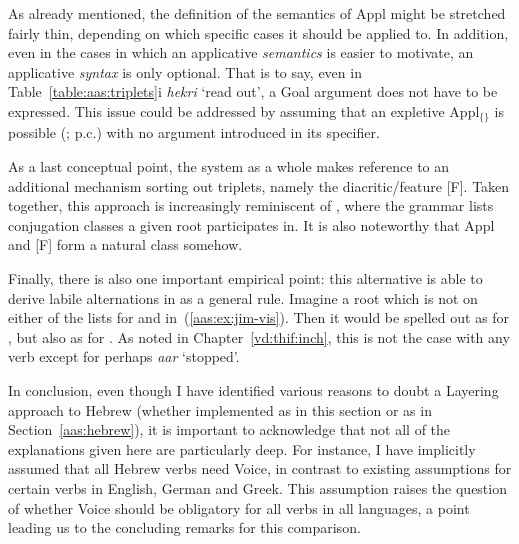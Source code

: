 \begin{exe}
\begin{xlist}
\begin{exe}
\begin{exe}
\begin{xlist}
\begin{exe}
\begin{exe}
\begin{exe}
\begin{exe}
\begin{exe}
\begin{xlist}
\begin{exe}
\begin{exe}
\begin{xlist}
\begin{exe}
\begin{xlist}
\begin{exe}
\begin{xlist}
\begin{exe}
\begin{xlist}
As already mentioned, the definition of the semantics of Appl might be stretched fairly thin, depending on which specific cases it should be applied to. In addition, even in the cases in which an applicative \emph{semantics} is easier to motivate, an applicative \emph{syntax} is only optional. That is to say, even in Table~\ref{table:aas:triplets}i \emph{hekri} `read out', a Goal argument does not have to be expressed. This issue could be addressed by assuming that an expletive Appl$_{\text{\{\}}}$ is possible (\citealt{wood15springer}; p.c.) with no argument introduced in its specifier.

As a last conceptual point, the system as a whole makes reference to an additional mechanism sorting out triplets, namely the diacritic/feature [F]. Taken together, this approach is increasingly reminiscent of \cite{arad05}, where the grammar lists conjugation classes a given root participates in. It is also noteworthy that Appl and [F] form a natural class somehow. 

Finally, there is also one important empirical point: this alternative is able to derive labile alternations in {\tkal} as a general rule. Imagine a root  which is not on either of the lists for {\vds} and {\vzs} in~(\ref{aas:ex:jim-vis}). Then it would be spelled out as {\tkal} for {\vds}, but also as {\tkal} for {\vzs}. As noted in Chapter~\ref{vd:thif:inch}, this is not the case with any verb except for perhaps \emph{a{\ts}ar} `stopped'.

In conclusion, even though I have identified various reasons to doubt a Layering approach to Hebrew (whether implemented as in this section or as in Section~\ref{aas:hebrew}), it is important to acknowledge that not all of the explanations given here are particularly deep. For instance, I have implicitly assumed that all Hebrew verbs need Voice, in contrast to existing assumptions for certain verbs in English, German and Greek. This assumption raises the question of whether Voice should be obligatory for all verbs in all languages, a point leading us to the concluding remarks for this comparison.



\end{xlist}
\end{exe}
\end{xlist}
\end{exe}
\end{xlist}
\end{exe}
\end{xlist}
\end{exe}
\end{exe}
\end{xlist}
\end{exe}
\end{exe}
\end{exe}
\end{exe}
\end{exe}
\end{xlist}
\end{exe}
\end{exe}
\end{xlist}
\end{exe}
